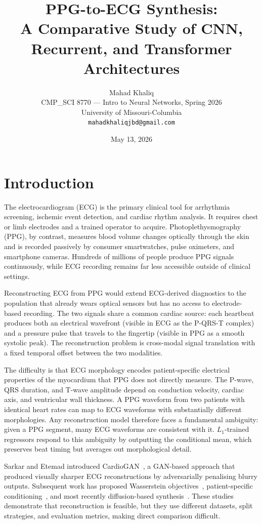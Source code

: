 \documentclass[11pt,a4paper]{article}
\title{\textbf{PPG-to-ECG Synthesis:\\A Comparative Study of CNN, Recurrent, and Transformer Architectures}}
\author{Mahad Khaliq\\
\small CMP\_SCI 8770 --- Intro to Neural Networks, Spring 2026\\
\small University of Missouri-Columbia\\
\small \texttt{mahadkhaliqjbd@gmail.com}}
\date{May 13, 2026}
\begin{document}
\maketitle

\section{Introduction}

The electrocardiogram (ECG) is the primary clinical tool for arrhythmia screening, ischemic event detection, and cardiac rhythm analysis. It requires chest or limb electrodes and a trained operator to acquire. Photoplethysmography (PPG), by contrast, measures blood volume changes optically through the skin and is recorded passively by consumer smartwatches, pulse oximeters, and smartphone cameras. Hundreds of millions of people produce PPG signals continuously, while ECG recording remains far less accessible outside of clinical settings.

Reconstructing ECG from PPG would extend ECG-derived diagnostics to the population that already wears optical sensors but has no access to electrode-based recording. The two signals share a common cardiac source: each heartbeat produces both an electrical wavefront (visible in ECG as the P-QRS-T complex) and a pressure pulse that travels to the fingertip (visible in PPG as a smooth systolic peak). The reconstruction problem is cross-modal signal translation with a fixed temporal offset between the two modalities.

The difficulty is that ECG morphology encodes patient-specific electrical properties of the myocardium that PPG does not directly measure. The P-wave, QRS duration, and T-wave amplitude depend on conduction velocity, cardiac axis, and ventricular wall thickness. A PPG waveform from two patients with identical heart rates can map to ECG waveforms with substantially different morphologies. Any reconstruction model therefore faces a fundamental ambiguity: given a PPG segment, many ECG waveforms are consistent with it. $L_1$-trained regressors respond to this ambiguity by outputting the conditional mean, which preserves beat timing but averages out morphological detail.

Sarkar and Etemad introduced CardioGAN~\cite{sarkar2021cardiogan}, a GAN-based approach that produced visually sharper ECG reconstructions by adversarially penalising blurry outputs. Subsequent work has proposed Wasserstein objectives~\cite{vo2021p2ewgan}, patient-specific conditioning~\cite{tang2022ppg2ecgps}, and most recently diffusion-based synthesis~\cite{liu2024rddm,chen2025ppgflowecg}. These studies demonstrate that reconstruction is feasible, but they use different datasets, split strategies, and evaluation metrics, making direct comparison difficult.
\end{document}
